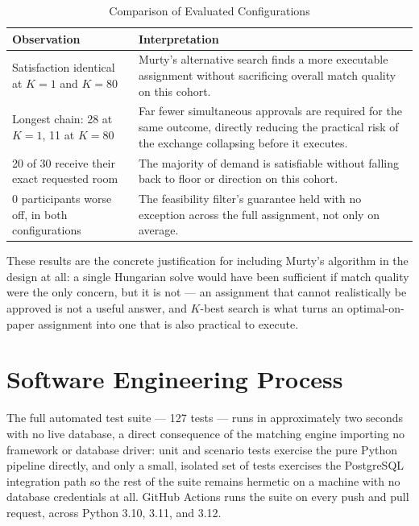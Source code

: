 \documentclass[11pt,a4paper]{report}
\begin{document}
\begin{table}[H]
\centering
\begin{tabular}{p{} p{}}
\toprule
\textbf{Observation} & \textbf{Interpretation} \\
\midrule

Satisfaction identical at $K=1$ and $K=80$ &
Murty's alternative search finds a more executable assignment without
sacrificing overall match quality on this cohort. \\

Longest chain: 28 at $K=1$, 11 at $K=80$ &
Far fewer simultaneous approvals are required for the same outcome,
directly reducing the practical risk of the exchange collapsing before
it executes. \\

20 of 30 receive their exact requested room &
The majority of demand is satisfiable without falling back to floor
or direction on this cohort. \\

0 participants worse off, in both configurations &
The feasibility filter's guarantee held with no exception across the
full assignment, not only on average. \\

\bottomrule
\end{tabular}
\caption{Comparison of Evaluated Configurations}
\label{tab:comparison}
\end{table}

These results are the concrete justification for including Murty's
algorithm in the design at all: a single Hungarian solve would have
been sufficient if match quality were the only concern, but it is not
--- an assignment that cannot realistically be approved is not a
useful answer, and $K$-best search is what turns an optimal-on-paper
assignment into one that is also practical to execute.

\section{Software Engineering Process}

The full automated test suite --- 127 tests --- runs in approximately
two seconds with no live database, a direct consequence of the
matching engine importing no framework or database driver: unit and
scenario tests exercise the pure Python pipeline directly, and only a
small, isolated set of tests exercises the PostgreSQL integration path
so the rest of the suite remains hermetic on a machine with no
database credentials at all. GitHub Actions runs the suite on every
push and pull request, across Python 3.10, 3.11, and 3.12.
\end{document}
